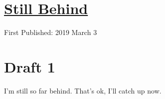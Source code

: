 \documentclass[12pt]{article}
\renewcommand{\,}{\textsuperscript{,}}
\begin{document}
\doublespacing
\section{\href{still-behind}{Still Behind}}
First Published: 2019 March 3
\section{Draft 1}
I'm still so far behind.
That's ok, I'll catch up now.
\end{document}
